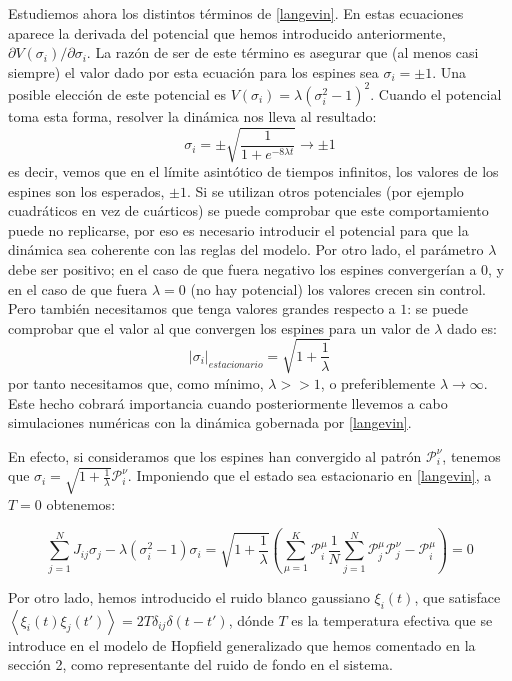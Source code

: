 \documentclass[titlepage,12pt]{article}
\numberwithin{equation}{section}
\begin{document}
	Estudiemos ahora los distintos términos de \eqref{langevin}. En estas ecuaciones aparece la derivada del potencial que hemos introducido anteriormente, ${\partial V(\sigma_i)}/{\partial \sigma_i}$. La razón de ser de este término es asegurar que (al menos casi siempre) el valor dado por esta ecuación para los espines sea $\sigma_i=\pm 1$. Una posible elección de este potencial es $V(\sigma_i)=\lambda\left(\sigma_i^2-1\right)^2$. Cuando el potencial toma esta forma, resolver la dinámica nos lleva al resultado:
	\begin{displaymath}
	\sigma_i = \pm\sqrt{\frac{1}{1 + e^{-8\lambda t}}}\rightarrow\pm 1
	\end{displaymath}
	es decir, vemos que en el límite asintótico de tiempos infinitos, los valores de los espines son los esperados, $\pm 1$. Si se utilizan otros potenciales (por ejemplo cuadráticos en vez de cuárticos) se puede comprobar que este comportamiento puede no replicarse, por eso es necesario introducir el potencial para que la dinámica sea coherente con las reglas del modelo. Por otro lado, el parámetro $\lambda$ debe ser positivo; en el caso de que fuera negativo los espines convergerían a $0$, y en el caso de que fuera $\lambda = 0$ (no hay potencial) los valores crecen sin control. Pero también necesitamos que tenga valores grandes respecto a $1$: se puede comprobar que el valor al que convergen los espines para un valor de $\lambda$ dado es:
	\begin{displaymath}
	|\sigma_i|_{estacionario}=\sqrt{1 + \frac{1}{\lambda}}
	\end{displaymath}
	por tanto necesitamos que, como mínimo, $\lambda >> 1$, o preferiblemente $\lambda\rightarrow\infty$. Este hecho cobrará importancia cuando posteriormente llevemos a cabo simulaciones numéricas con la dinámica gobernada por \eqref{langevin}.

    En efecto, si consideramos que los espines han convergido al patrón $\mathcal{P}^\nu_i$, tenemos que $\sigma_i = \sqrt{1 + \frac{1}{\lambda}} \mathcal{P}^\nu_i$. Imponiendo que el estado sea estacionario en \eqref{langevin}, a $T = 0$ obtenemos:

	\begin{equation*}
	\sum_{j=1}^N J_{ij}\sigma_j - \lambda(\sigma_i^2-1)\sigma_i = \sqrt{1 + \frac{1}{\lambda}} \left( \sum_{\mu=1}^K \mathcal{P}^\mu_i \frac{1}{N} \sum_{j=1}^N \mathcal{P}^\mu_j \mathcal{P}^\nu_j  - \mathcal{P}^\mu_i \right) = 0
	\end{equation*} 
	
	Por otro lado, hemos introducido el ruido blanco gaussiano $\xi_i(t)$, que satisface $\left<\xi_i(t)\xi_j(t')\right>=2T\delta_{ij}\delta(t-t')$, dónde $T$ es la temperatura efectiva que se introduce en el modelo de Hopfield generalizado que hemos comentado en la sección 2, como representante del ruido de fondo en el sistema.
	
\end{document}
